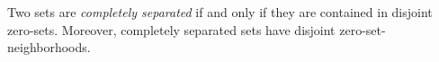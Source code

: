 Two sets are \emph{completely separated} if and only if they are contained in disjoint zero-sets. Moreover, completely separated sets have disjoint zero-set-neighborhoods.
